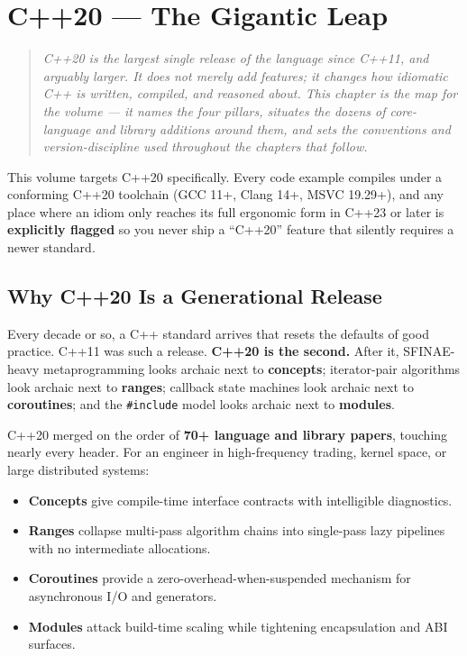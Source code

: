 \chapter{C++20 --- The Gigantic Leap}
\label{ch:c20-map}

\begin{quote}
\emph{C++20 is the largest single release of the language since C++11, and arguably larger. It does not merely add features; it changes how idiomatic C++ is written, compiled, and reasoned about. This chapter is the map for the volume --- it names the four pillars, situates the dozens of core-language and library additions around them, and sets the conventions and version-discipline used throughout the chapters that follow.}
\end{quote}

This volume targets C++20 specifically. Every code example compiles under a conforming C++20 toolchain (GCC 11+, Clang 14+, MSVC 19.29+), and any place where an idiom only reaches its full ergonomic form in C++23 or later is \textbf{explicitly flagged} so you never ship a ``C++20'' feature that silently requires a newer standard.

\section{Why C++20 Is a Generational Release}
\label{sec:c20-generational}

Every decade or so, a C++ standard arrives that resets the defaults of good practice. C++11 was such a release. \textbf{C++20 is the second.} After it, SFINAE-heavy metaprogramming looks archaic next to \textbf{concepts}; iterator-pair algorithms look archaic next to \textbf{ranges}; callback state machines look archaic next to \textbf{coroutines}; and the \texttt{\#include} model looks archaic next to \textbf{modules}.

C++20 merged on the order of \textbf{70+ language and library papers}, touching nearly every header. For an engineer in high-frequency trading, kernel space, or large distributed systems:

\begin{itemize}
\item \textbf{Concepts} give compile-time interface contracts with intelligible diagnostics.
\item \textbf{Ranges} collapse multi-pass algorithm chains into single-pass lazy pipelines with no intermediate allocations.
\item \textbf{Coroutines} provide a zero-overhead-when-suspended mechanism for asynchronous I/O and generators.
\item \textbf{Modules} attack build-time scaling while tightening encapsulation and ABI surfaces.
\end{itemize}

